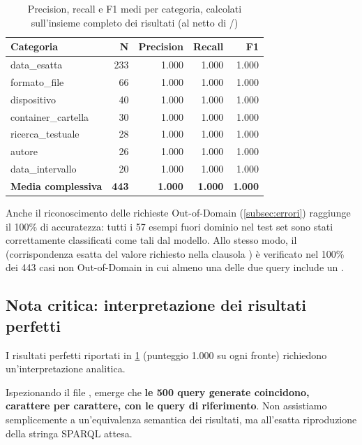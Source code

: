 \begin{table}[ht]
\centering
\begin{tabular}{lrrrr}
\toprule
Categoria & N & Precision & Recall & F1 \\
\midrule
data\_esatta        & 233 & 1.000 & 1.000 & 1.000 \\
formato\_file       & 66  & 1.000 & 1.000 & 1.000 \\
dispositivo         & 40  & 1.000 & 1.000 & 1.000 \\
container\_cartella & 30  & 1.000 & 1.000 & 1.000 \\
ricerca\_testuale   & 28  & 1.000 & 1.000 & 1.000 \\
autore              & 26  & 1.000 & 1.000 & 1.000 \\
data\_intervallo    & 20  & 1.000 & 1.000 & 1.000 \\
\midrule
\textbf{Media complessiva} & \textbf{443} & \textbf{1.000} & \textbf{1.000} & \textbf{1.000} \\
\bottomrule
\end{tabular}
\caption{Precision, recall e F1 medi per categoria, calcolati sull'insieme completo dei risultati (al netto di /)}\label{tab:metriche_categoria}
\end{table}

Anche il riconoscimento delle richieste Out-of-Domain (\cref{subsec:errori}) raggiunge il 100\% di accuratezza: tutti i 57 esempi fuori dominio nel test set sono stati correttamente classificati come tali dal modello. Allo stesso modo, il  (corrispondenza esatta del valore richiesto nella clausola ) è verificato nel 100\% dei 443 casi non Out-of-Domain in cui almeno una delle due query include un .

\subsection{Nota critica: interpretazione dei risultati perfetti}\label{subsec:nota_critica}

I risultati perfetti riportati in \cref{tab:metriche_categoria} (punteggio 1.000 su ogni fronte) richiedono un'interpretazione analitica.

Ispezionando il file , emerge che \textbf{le 500 query generate coincidono, carattere per carattere, con le query di riferimento}. Non assistiamo semplicemente a un'equivalenza semantica dei risultati, ma all'esatta riproduzione della stringa SPARQL attesa.

